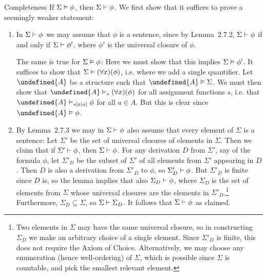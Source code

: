 \documentclass[article, a4paper, 11pt, oneside]{memoir}
\let\mathfrak\undefined
\numberwithin{equation}{chapter}
\newcommand{\frakA}{\mathfrak{A}}
\theoremstyle{nonumberplain}
\begin{document}
\begin{notelist}
    \item[Completeness]
    If $\Sigma \vDash \phi$, then $\Sigma \vdash \phi$. We first show that it suffices to prove a seemingly weaker statement:
    \begin{enumerate}
        \item In $\Sigma \vdash \phi$ we may assume that $\phi$ is a sentence, since by Lemma~2.7.2, $\Sigma \vdash \phi$ if and only if $\Sigma \vdash \phi'$, where $\phi'$ is the universal closure of $\phi$. 
        
        The same is true for $\Sigma \vDash \phi$: Here we must show that this implies $\Sigma \vDash \phi'$. It suffices to show that $\Sigma \vDash (\forall x)(\phi)$, i.e. where we add a single quantifier. Let $\frakA$ be a structure such that $\frakA \models \Sigma$. We must then show that $\frakA \sats{s} (\forall x)(\phi)$ for all assignment functions $s$, i.e. that $\frakA \sats{s[x|a]} \phi$ for all $a \in A$. But this is clear since $\frakA \models \phi$.

        \item By Lemma~2.7.3 we may in $\Sigma \vdash \phi$ also assume that every element of $\Sigma$ is a sentence: Let $\Sigma'$ be the set of universal closures of elements in $\Sigma$. Then we claim that if $\Sigma' \vdash \phi$, then $\Sigma \vdash \phi$. For any derivation $D$ from $\Sigma'$, say of the formula $\phi$, let $\Sigma'_D$ be the subset of $\Sigma'$ of all elements from $\Sigma'$ appearing in $D$. Then $D$ is also a derivation from $\Sigma'_D$ to $\phi$, so $\Sigma'_D \vdash \phi$. But $\Sigma'_D$ is finite since $D$ is, so the lemma implies that also $\Sigma_D \vdash \phi$, where $\Sigma_D$ is the set of elements from $\Sigma$ whose universal closures are the elements in $\Sigma'_D$.\footnote{Two elements in $\Sigma$ may have the same universal closure, so in constructing $\Sigma_D$ we make an arbitrary choice of a single element. Since $\Sigma'_D$ is finite, this does not require the Axiom of Choice. Alternatively, we may choose any enumeration (hence well-ordering) of $\Sigma$, which is possible since $\Sigma$ is countable, and pick the smallest relevant element.} Furthermore, $\Sigma_D \subseteq \Sigma$, so $\Sigma \vdash \Sigma_D$. It follows that $\Sigma \vdash \phi$ as claimed.
        

\end{enumerate}
\end{notelist}
\end{document}
